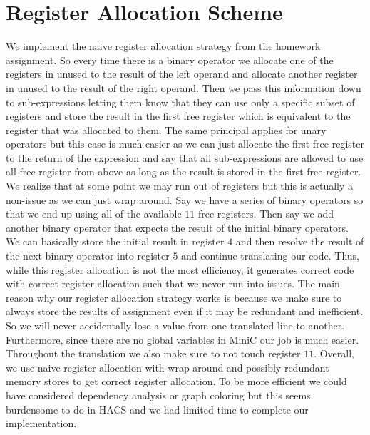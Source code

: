 \documentclass{article}
\begin{document}
\section{Register Allocation Scheme}
We implement the naive register allocation strategy from the homework assignment. So every time there is a binary operator we allocate one of the registers in unused to the result of the left operand and allocate another register in unused to the result of the right operand. Then we pass this information down to sub-expressions letting them know that they can use only a specific subset of registers and store the result in the first free register which is equivalent to the register that was allocated to them. The same principal applies for unary operators but this case is much easier as we can just allocate the first free register to the return of the expression and say that all sub-expressions are allowed to use all free register from above as long as the result is stored in the first free register. We realize that at some point we may run out of registers but this is actually a non-issue as we can just wrap around. Say we have a series of binary operators so that we end up using all of the available $11$ free registers. Then say we add another binary operator that expects the result of the initial binary operators. We can basically store the initial result in register $4$ and then resolve the result of the next binary operator into register $5$ and continue translating our code. Thus, while this register allocation is not the most efficiency, it generates correct code with correct register allocation such that we never run into issues. The main reason why our register allocation strategy works is because we make sure to always store the results of assignment even if it may be redundant and inefficient. So we will never accidentally lose a value from one translated line to another. Furthermore, since there are no global variables in MiniC our job is much easier. Throughout the translation we also make sure to not touch register $11$. Overall, we use naive register allocation with wrap-around and possibly redundant memory stores to get correct register allocation. To be more efficient we could have considered dependency analysis or graph coloring but this seems burdensome to do in HACS and we had limited time to complete our implementation.
\end{document}
